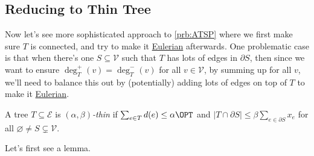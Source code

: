 \subsection{Reducing to Thin Tree}
Now let's see more sophisticated approach to \autoref{prb:ATSP} where we first make sure \(T\) is connected, and try to make it  \href{https://en.wikipedia.org/wiki/Eulerian_path}{Eulerian} afterwards. One problematic case is that when there's one \(S \subseteq \mathcal{V} \) such that \(T\) has lots of edges in \(\partial S\), then since we want to ensure \(\deg^+_T(v) = \deg^-_T(v)\) for all \(v\in \mathcal{V} \), by summing up for all \(v\), we'll need to balance this out by (potentially) adding lots of edges on top of \(T\) to make it  \href{https://en.wikipedia.org/wiki/Eulerian_path}{Eulerian}.

\begin{definition}\label{def:thin}
	A tree \(T\subseteq \mathcal{E} \) is \emph{\((\alpha , \beta )\)-thin} if \(\sum_{e\in T} d(e) \leq \alpha \OPT\) and \(\left\vert T \cap \partial S \right\vert \leq \beta \sum_{e\in \partial S} x_e\) for all \(\varnothing \neq S \subsetneq \mathcal{V} \).
\end{definition}

Let's first see a lemma.

